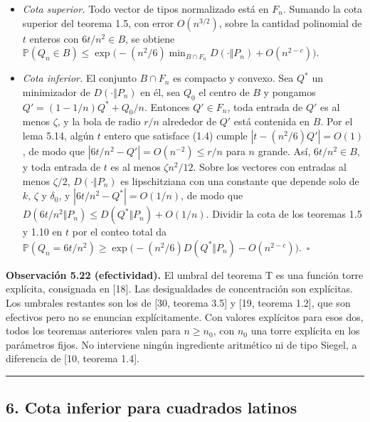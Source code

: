 \documentclass[spanish,11pt,a4paper]{article}
\providecommand{\tightlist}{\setlength{\itemsep}{0pt}\setlength{\parskip}{0pt}}
\begin{document}
\begin{itemize}
\tightlist
\item
  \emph{Cota superior.} Todo vector de tipos normalizado está en \(F_n\). Sumando la cota superior del teorema 1.5, con error \(O(n^{3/2})\), sobre la cantidad polinomial de \(t\) enteros con \(6t/n^2\in B\), se obtiene \(\mathbb P(Q_n\in B)\le\exp\bigl(-(n^2/6)\min_{B\cap F_n}D(\cdot\Vert P_n)+O(n^{2-c})\bigr)\).
\item
  \emph{Cota inferior.} El conjunto \(B\cap F_n\) es compacto y convexo. Sea \(Q^*\) un minimizador de \(D(\cdot\Vert P_n)\) en él, sea \(Q_0\) el centro de \(B\) y pongamos \(Q'=(1-1/n)Q^*+Q_0/n\). Entonces \(Q'\in F_n\), toda entrada de \(Q'\) es al menos \(\zeta\), y la bola de radio \(r/n\) alrededor de \(Q'\) está contenida en \(B\). Por el lema 5.14, algún \(t\) entero que satisface (1.4) cumple \(|t-(n^2/6)Q'|=O(1)\), de modo que \(|6t/n^2-Q'|=O(n^{-2})\le r/n\) para \(n\) grande. Así, \(6t/n^2\in B\), y toda entrada de \(t\) es al menos \(\zeta n^2/12\). Sobre los vectores con entradas al menos \(\zeta/2\), \(D(\cdot\Vert P_n)\) es lipschitziana con una constante que depende solo de \(k\), \(\zeta\) y \(\delta_0\), y \(|6t/n^2-Q^*|=O(1/n)\), de modo que \(D(6t/n^2\Vert P_n)\le D(Q^*\Vert P_n)+O(1/n)\). Dividir la cota de los teoremas 1.5 y 1.10 en \(t\) por el conteo total da \(\mathbb P(Q_n=6t/n^2)\ge\exp\bigl(-(n^2/6)D(Q^*\Vert P_n)-O(n^{2-c})\bigr)\).~\(\square\)
\end{itemize}

\textbf{Observación 5.22 (efectividad).} El umbral del teorema T es una función torre explícita, consignada en {[}18{]}. Las desigualdades de concentración son explícitas. Los umbrales restantes son los de {[}30, teorema 3.5{]} y {[}19, teorema 1.2{]}, que son efectivos pero no se enuncian explícitamente. Con valores explícitos para esos dos, todos los teoremas anteriores valen para \(n\ge n_0\), con \(n_0\) una torre explícita en los parámetros fijos. No interviene ningún ingrediente aritmético ni de tipo Siegel, a diferencia de {[}10, teorema 1.4{]}.

\begin{center}\rule{0.5\linewidth}{0.5pt}\end{center}

\subsection{6. Cota inferior para cuadrados latinos}\label{cota-inferior-para-cuadrados-latinos}
\end{document}
